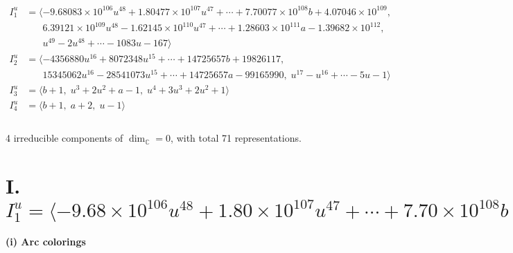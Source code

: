 \documentclass[1p]{elsarticle_modified}
\theoremstyle{definition}
\begin{document}
\begin{align*}
I^u_{1}&=\langle 
-9.68083\times10^{106} u^{48}+1.80477\times10^{107} u^{47}+\cdots+7.70077\times10^{108} b+4.07046\times10^{109},\\
\phantom{I^u_{1}}&\phantom{= \langle  }6.39121\times10^{109} u^{48}-1.62145\times10^{110} u^{47}+\cdots+1.28603\times10^{111} a-1.39682\times10^{112},\\
\phantom{I^u_{1}}&\phantom{= \langle  }u^{49}-2 u^{48}+\cdots-1083 u-167\rangle \\
I^u_{2}&=\langle 
-4356880 u^{16}+8072348 u^{15}+\cdots+14725657 b+19826117,\\
\phantom{I^u_{2}}&\phantom{= \langle  }15345062 u^{16}-28541073 u^{15}+\cdots+14725657 a-99165990,\;u^{17}- u^{16}+\cdots-5 u-1\rangle \\
I^u_{3}&=\langle 
b+1,\;u^3+2 u^2+a-1,\;u^4+3 u^3+2 u^2+1\rangle \\
I^u_{4}&=\langle 
b+1,\;a+2,\;u-1\rangle \\
\\
\end{align*}
\raggedright * 4 irreducible components of $\dim_{\mathbb{C}}=0$, with total 71 representations.\\
\newpage
\renewcommand{\arraystretch}{1}
\centering \section*{I. $I^u_{1}= \langle -9.68\times10^{106} u^{48}+1.80\times10^{107} u^{47}+\cdots+7.70\times10^{108} b+4.07\times10^{109},\;6.39\times10^{109} u^{48}-1.62\times10^{110} u^{47}+\cdots+1.29\times10^{111} a-1.40\times10^{112},\;u^{49}-2 u^{48}+\cdots-1083 u-167 \rangle$}
\flushleft \textbf{(i) Arc colorings}\\
\end{document}
